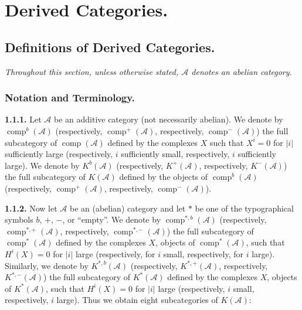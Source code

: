 \chapter{Derived Categories.}
%
\begingroup
\small
\setlength{\parskip}{0pt}
\setlength{\emergencystretch}{1.5em}
\setlength{\abovedisplayskip}{4pt plus 2pt minus 2pt}%
\setlength{\belowdisplayskip}{4pt plus 2pt minus 2pt}%

\section{Definitions of Derived Categories.}

\noindent\textit{Throughout this section, unless otherwise stated,
$\mathcal A$ denotes an abelian category.}

\subsection{Notation and Terminology.}

\noindent\textbf{1.1.1.}\quad
Let $\mathcal A$ be an additive category (not necessarily abelian). We
denote by $\operatorname{comp}^{b}(\mathcal A)$ (respectively,
$\operatorname{comp}^{+}(\mathcal A)$, respectively,
$\operatorname{comp}^{-}(\mathcal A)$) the full subcategory of
$\operatorname{comp}(\mathcal A)$ defined by the complexes $X$ such that
$X^i=0$ for $|i|$ sufficiently large (respectively, $i$ sufficiently
small, respectively, $i$ sufficiently large). We denote by
$K^{b}(\mathcal A)$ (respectively, $K^{+}(\mathcal A)$, respectively,
$K^{-}(\mathcal A)$) the full subcategory of $K(\mathcal A)$ defined by the
objects of $\operatorname{comp}^{b}(\mathcal A)$ (respectively,
$\operatorname{comp}^{+}(\mathcal A)$, respectively,
$\operatorname{comp}^{-}(\mathcal A)$).

\noindent\textbf{1.1.2.}\quad
Now let $\mathcal A$ be an (abelian) category and let $*$ be one of the
typographical symbols $b$, $+$, $-$, or ``empty''. We denote by
$\operatorname{comp}^{*,b}(\mathcal A)$ (respectively,
$\operatorname{comp}^{*,+}(\mathcal A)$, respectively,
$\operatorname{comp}^{*,-}(\mathcal A)$) the full subcategory of
$\operatorname{comp}^{*}(\mathcal A)$ defined by the complexes $X$, objects
of $\operatorname{comp}^{*}(\mathcal A)$, such that $H^i(X)=0$ for $|i|$
large (respectively, for $i$ small, respectively, for $i$ large).
Similarly, we denote by $K^{*,b}(\mathcal A)$ (respectively,
$K^{*,+}(\mathcal A)$, respectively, $K^{*,-}(\mathcal A)$) the full
subcategory of $K^{*}(\mathcal A)$ defined by the complexes $X$, objects of
$K^{*}(\mathcal A)$, such that $H^i(X)=0$ for $|i|$ large (respectively,
$i$ small, respectively, $i$ large). Thus we obtain eight subcategories of
$K(\mathcal A)$:


